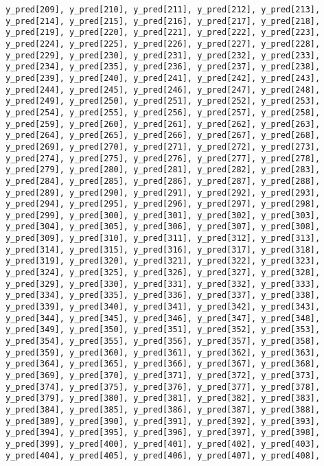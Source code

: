 \documentclass[
  letterpaper,
  DIV=11,
  numbers=noendperiod]{scrartcl}
\begin{document}
\begin{verbatim}
y_pred[209], y_pred[210], y_pred[211], y_pred[212], y_pred[213],
y_pred[214], y_pred[215], y_pred[216], y_pred[217], y_pred[218],
y_pred[219], y_pred[220], y_pred[221], y_pred[222], y_pred[223],
y_pred[224], y_pred[225], y_pred[226], y_pred[227], y_pred[228],
y_pred[229], y_pred[230], y_pred[231], y_pred[232], y_pred[233],
y_pred[234], y_pred[235], y_pred[236], y_pred[237], y_pred[238],
y_pred[239], y_pred[240], y_pred[241], y_pred[242], y_pred[243],
y_pred[244], y_pred[245], y_pred[246], y_pred[247], y_pred[248],
y_pred[249], y_pred[250], y_pred[251], y_pred[252], y_pred[253],
y_pred[254], y_pred[255], y_pred[256], y_pred[257], y_pred[258],
y_pred[259], y_pred[260], y_pred[261], y_pred[262], y_pred[263],
y_pred[264], y_pred[265], y_pred[266], y_pred[267], y_pred[268],
y_pred[269], y_pred[270], y_pred[271], y_pred[272], y_pred[273],
y_pred[274], y_pred[275], y_pred[276], y_pred[277], y_pred[278],
y_pred[279], y_pred[280], y_pred[281], y_pred[282], y_pred[283],
y_pred[284], y_pred[285], y_pred[286], y_pred[287], y_pred[288],
y_pred[289], y_pred[290], y_pred[291], y_pred[292], y_pred[293],
y_pred[294], y_pred[295], y_pred[296], y_pred[297], y_pred[298],
y_pred[299], y_pred[300], y_pred[301], y_pred[302], y_pred[303],
y_pred[304], y_pred[305], y_pred[306], y_pred[307], y_pred[308],
y_pred[309], y_pred[310], y_pred[311], y_pred[312], y_pred[313],
y_pred[314], y_pred[315], y_pred[316], y_pred[317], y_pred[318],
y_pred[319], y_pred[320], y_pred[321], y_pred[322], y_pred[323],
y_pred[324], y_pred[325], y_pred[326], y_pred[327], y_pred[328],
y_pred[329], y_pred[330], y_pred[331], y_pred[332], y_pred[333],
y_pred[334], y_pred[335], y_pred[336], y_pred[337], y_pred[338],
y_pred[339], y_pred[340], y_pred[341], y_pred[342], y_pred[343],
y_pred[344], y_pred[345], y_pred[346], y_pred[347], y_pred[348],
y_pred[349], y_pred[350], y_pred[351], y_pred[352], y_pred[353],
y_pred[354], y_pred[355], y_pred[356], y_pred[357], y_pred[358],
y_pred[359], y_pred[360], y_pred[361], y_pred[362], y_pred[363],
y_pred[364], y_pred[365], y_pred[366], y_pred[367], y_pred[368],
y_pred[369], y_pred[370], y_pred[371], y_pred[372], y_pred[373],
y_pred[374], y_pred[375], y_pred[376], y_pred[377], y_pred[378],
y_pred[379], y_pred[380], y_pred[381], y_pred[382], y_pred[383],
y_pred[384], y_pred[385], y_pred[386], y_pred[387], y_pred[388],
y_pred[389], y_pred[390], y_pred[391], y_pred[392], y_pred[393],
y_pred[394], y_pred[395], y_pred[396], y_pred[397], y_pred[398],
y_pred[399], y_pred[400], y_pred[401], y_pred[402], y_pred[403],
y_pred[404], y_pred[405], y_pred[406], y_pred[407], y_pred[408],

\end{verbatim}
\end{document}
